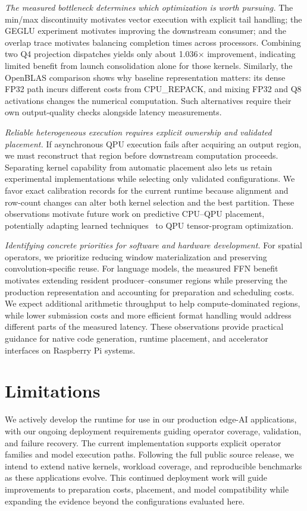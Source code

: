 \documentclass[sigplan,screen,review]{acmart}
\begin{document}
\textit{The measured bottleneck determines which optimization is worth pursuing.} The min/max discontinuity motivates vector execution with explicit tail handling; the GEGLU experiment motivates improving the downstream consumer; and the overlap trace motivates balancing completion times across processors. Combining two Q4 projection dispatches yields only about 1.036$\times$ improvement, indicating limited benefit from launch consolidation alone for those kernels. Similarly, the OpenBLAS comparison shows why baseline representation matters: its dense FP32 path incurs different costs from CPU\_REPACK, and mixing FP32 and Q8 activations changes the numerical computation. Such alternatives require their own output-quality checks alongside latency measurements.

\textit{Reliable heterogeneous execution requires explicit ownership and validated placement.} If asynchronous QPU execution fails after acquiring an output region, we must reconstruct that region before downstream computation proceeds. Separating kernel capability from automatic placement also lets us retain experimental implementations while selecting only validated configurations. We favor exact calibration records for the current runtime because alignment and row-count changes can alter both kernel selection and the best partition. These observations motivate future work on predictive CPU--QPU placement, potentially adapting learned techniques~\cite{ansor} to QPU tensor-program optimization.

\textit{Identifying concrete priorities for software and hardware development.} For spatial operators, we prioritize reducing window materialization and preserving convolution-specific reuse. 
For language models, the measured FFN benefit motivates extending resident producer--consumer regions while preserving the production representation and accounting for preparation and scheduling costs. We expect additional arithmetic throughput to help compute-dominated regions, while lower submission costs and more efficient format handling would address different parts of the measured latency. These observations provide practical guidance for native code generation, runtime placement, and accelerator interfaces on Raspberry Pi systems.   


\section{Limitations}

We actively develop the runtime for use in our production edge-AI applications, with our ongoing deployment requirements guiding operator coverage, validation, and failure recovery. The current implementation supports explicit operator families and model execution paths. Following the full public source release, we intend to extend native kernels, workload coverage, and reproducible benchmarks as these applications evolve. This continued deployment work will guide improvements to preparation costs, placement, and model compatibility while expanding the evidence beyond the configurations evaluated here.
\end{document}
